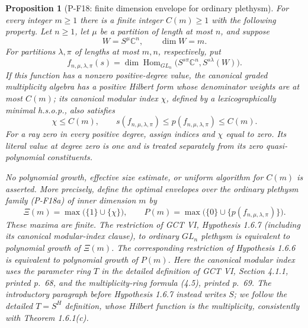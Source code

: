 \documentclass[11pt,a4paper]{article}
\newtheorem{proposition}{Proposition}[section]
\begin{document}
\begin{proposition}[P-F18: finite dimension envelope for ordinary plethysm]
\label{prop:innerdimensionbound}
For every integer $m\ge1$ there is a finite integer $C(m)\ge1$ with
the following property. Let $n\ge1$, let $\mu$ be a partition of
length at most $n$, and suppose
\[
 W=S^\mu\mathbb C^n,\qquad \dim W=m.
\]
For partitions $\lambda,\pi$ of lengths at most $m,n$, respectively,
put
\[
 f_{n,\mu,\lambda,\pi}(s)
 =\dim\operatorname{Hom}_{GL_n}
   \bigl(S^{s\pi}\mathbb C^n,S^{s\lambda}(W)\bigr).
 \tag{P-F18a}
\]
If this function has a nonzero positive-degree value, the canonical
graded multiplicity algebra has a positive Hilbert form whose
denominator weights are at most $C(m)$; its canonical modular index
$\chi$, defined by a lexicographically minimal h.s.o.p., also satisfies
\[
 \chi\le C(m),\qquad
 s(f_{n,\mu,\lambda,\pi})\le
 p(f_{n,\mu,\lambda,\pi})\le C(m).
 \tag{P-F18b}
\]
For a ray zero in every positive degree, assign indices and $\chi$
equal to zero. Its literal value at degree zero is one and is treated
separately from its zero quasi-polynomial constituents.

No polynomial growth, effective size estimate, or uniform algorithm
for $C(m)$ is asserted. More precisely, define the optimal envelopes
over the ordinary plethysm family (P-F18a) of inner dimension $m$ by
\[
 \Xi(m)=\max\bigl(\{1\}\cup\{\chi\}\bigr),\qquad
 P(m)=\max\bigl(\{0\}\cup\{p(f_{n,\mu,\lambda,\pi})\}\bigr).
 \tag{P-F18c}
\]
These maxima are finite. The restriction of GCT VI,
Hypothesis 1.6.7 (including its canonical modular-index clause), to
ordinary $GL_n$ plethysm is equivalent to polynomial growth of
$\Xi(m)$. The corresponding restriction of Hypothesis 1.6.6 is
equivalent to polynomial growth of $P(m)$.
Here the canonical modular index uses the parameter ring $T$
in the detailed definition of GCT VI, Section 4.1.1, printed p.~68,
and the multiplicity-ring formula (4.5), printed p.~69.
The introductory paragraph before Hypothesis 1.6.7 instead writes
$S$; we follow the detailed $T=S^H$ definition, whose Hilbert
function is the multiplicity, consistently with Theorem 1.6.1(c).
\end{proposition}
\end{document}
